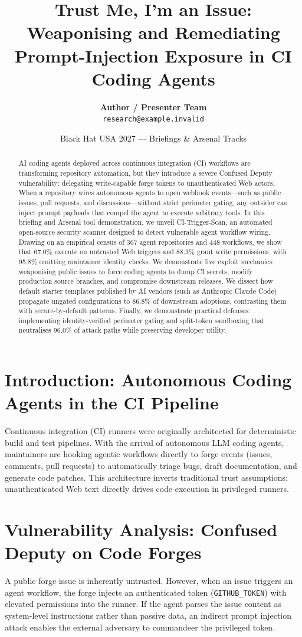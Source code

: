 \documentclass[11pt,a4paper]{article}
\title{\textbf{Trust Me, I'm an Issue: Weaponising and Remediating Prompt-Injection Exposure in CI Coding Agents}}
\author{
  \textbf{Author / Presenter Team}\\
  \texttt{research@example.invalid}
}
\date{Black Hat USA 2027 --- Briefings \& Arsenal Tracks}
\begin{document}
\maketitle

\begin{abstract}
AI coding agents deployed across continuous integration (CI) workflows are transforming repository automation, but they introduce a severe Confused Deputy vulnerability: delegating write-capable forge tokens to unauthenticated Web actors. When a repository wires autonomous agents to open webhook events---such as public issues, pull requests, and discussions---without strict perimeter gating, any outsider can inject prompt payloads that compel the agent to execute arbitrary tools. In this briefing and Arsenal tool demonstration, we unveil CI-Trigger-Scan, an automated open-source security scanner designed to detect vulnerable agent workflow wiring. Drawing on an empirical census of 367 agent repositories and 448 workflows, we show that 67.0\% execute on untrusted Web triggers and 88.3\% grant write permissions, with 95.8\% omitting maintainer identity checks. We demonstrate live exploit mechanics: weaponising public issues to force coding agents to dump CI secrets, modify production source branches, and compromise downstream releases. We dissect how default starter templates published by AI vendors (such as Anthropic Claude Code) propagate ungated configurations to 86.8\% of downstream adoptions, contrasting them with secure-by-default patterns. Finally, we demonstrate practical defenses: implementing identity-verified perimeter gating and split-token sandboxing that neutralises 96.0\% of attack paths while preserving developer utility.
\end{abstract}

\section{Introduction: Autonomous Coding Agents in the CI Pipeline}
Continuous integration (CI) runners were originally architected for deterministic build and test pipelines. With the arrival of autonomous LLM coding agents, maintainers are hooking agentic workflows directly to forge events (issues, comments, pull requests) to automatically triage bugs, draft documentation, and generate code patches. This architecture inverts traditional trust assumptions: unauthenticated Web text directly drives code execution in privileged runners.

\section{Vulnerability Analysis: Confused Deputy on Code Forges}
A public forge issue is inherently untrusted. However, when an issue triggers an agent workflow, the forge injects an authenticated token (\texttt{GITHUB\_TOKEN}) with elevated permissions into the runner. If the agent parses the issue content as system-level instructions rather than passive data, an indirect prompt injection attack enables the external adversary to commandeer the privileged token.
\end{document}
